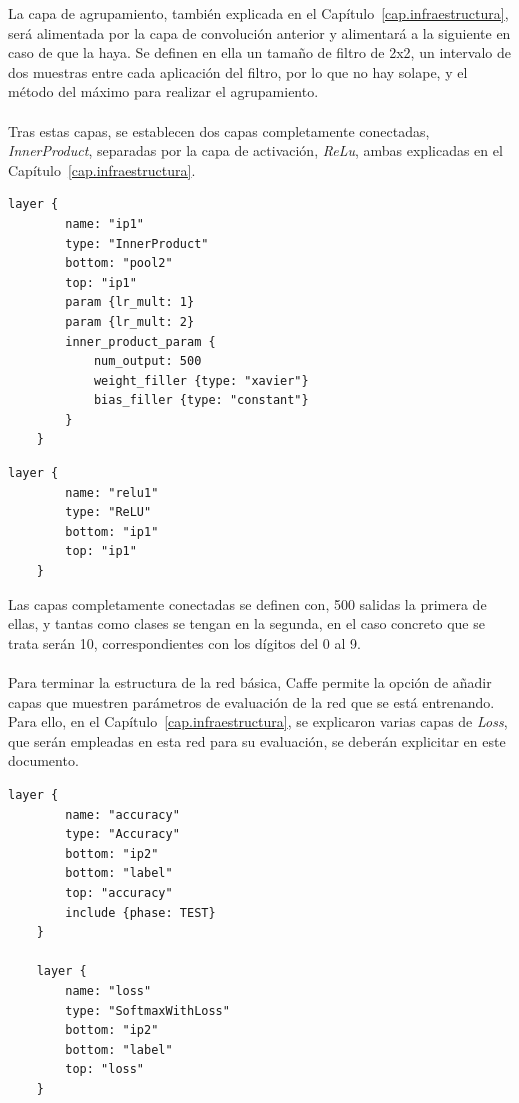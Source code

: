 \begin{description}
	La capa de agrupamiento, también explicada en el Capítulo~\ref{cap.infraestructura}, será alimentada por la capa de convolución anterior y alimentará a la siguiente en caso de que la haya. Se definen en ella un tamaño de filtro de 2x2, un intervalo de dos muestras entre cada aplicación del filtro, por lo que no hay solape, y el método del máximo para realizar el agrupamiento.\\
	\vspace{-10pt}
	\\
	Tras estas capas, se establecen dos capas completamente conectadas, \textit{InnerProduct}, separadas por la capa de activación, \textit{ReLu}, ambas explicadas en el Capítulo~\ref{cap.infraestructura}. 
	\vspace{10pt}
	\begin{lstlisting}[frame=single]
	layer {
		name: "ip1"
		type: "InnerProduct"
		bottom: "pool2"
		top: "ip1"
		param {lr_mult: 1}
		param {lr_mult: 2}
		inner_product_param {
			num_output: 500
			weight_filler {type: "xavier"}
			bias_filler {type: "constant"}
		}
	}	
	\end{lstlisting}
	
	\begin{lstlisting}[frame=single]
	layer {
		name: "relu1"
		type: "ReLU"
		bottom: "ip1"
		top: "ip1"
	}	
	\end{lstlisting}
	
	Las capas completamente conectadas se definen con, 500 salidas la primera de ellas, y tantas como clases se tengan en la segunda, en el caso concreto que se trata serán 10, correspondientes con los dígitos del 0 al 9.\\
	\vspace{-10pt}
	\\
	Para terminar la estructura de la red básica, Caffe permite la opción de añadir capas que muestren parámetros de evaluación de la red que se está entrenando. Para ello, en el Capítulo~\ref{cap.infraestructura}, se explicaron varias capas de \textit{Loss}, que serán empleadas en esta red para su evaluación, se deberán explicitar en este documento.
	\vspace{10pt}
	\begin{lstlisting}[frame=single]
	layer {
		name: "accuracy"
		type: "Accuracy"
		bottom: "ip2"
		bottom: "label"
		top: "accuracy"
		include {phase: TEST}
	}
	
	layer {
		name: "loss"
		type: "SoftmaxWithLoss"
		bottom: "ip2"
		bottom: "label"
		top: "loss"
	}	
	\end{lstlisting}
	

\end{description}
